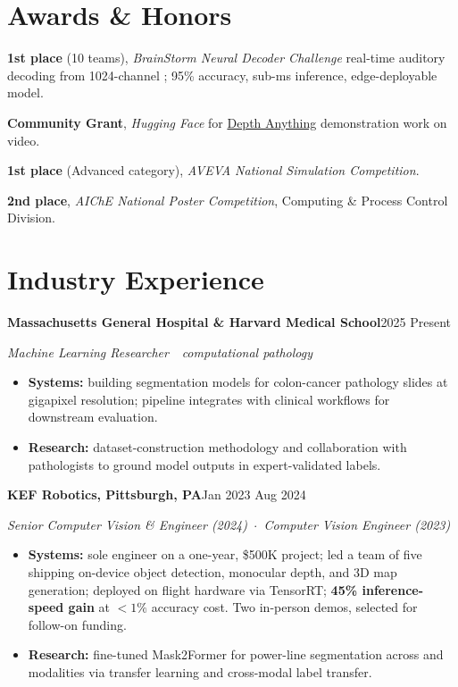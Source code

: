 \documentclass[10pt,letterpaper]{article}
\newcommand{\sansfam}{\sffamily}
\newcommand{\bdash}{\,\textemdash\,}
\newcommand{\datestamp}[1]{{\sansfam\footnotesize\color{meta}\figureversion{lf}#1}}
\newcommand{\role}[2]{%
  \filbreak%
  \par\vspace{1pt}%
  \noindent\textbf{#1}\hfill\datestamp{#2}\par\nopagebreak}
\newcommand{\sub}[1]{\noindent\textit{\footnotesize\color{meta} #1}\par\nopagebreak}
\newcommand{\acro}[1]{\textls[80]{#1}}
\begin{document}
\section{Awards \& Honors}

\begin{list}{}{%
  \setlength{\leftmargin}{3.4em}%
  \setlength{\labelwidth}{2.6em}%
  \setlength{\labelsep}{0.5em}%
  \setlength{\itemsep}{1pt}%
  \setlength{\parsep}{0pt}%
  \setlength{\topsep}{1pt}}
\item[\datestamp{2026}] \textbf{1st place} (10 teams), \textit{BrainStorm Neural Decoder Challenge}\bdash{}real-time auditory decoding from 1024-channel \acro{ECoG}; 95\% accuracy, sub-ms inference, edge-deployable model.
\item[\datestamp{2024}] \textbf{Community Grant}, \textit{Hugging Face}\bdash{}for \href{https://depth-anything.github.io/}{Depth Anything} demonstration work on video.
\item[\datestamp{2019}] \textbf{1st place} (Advanced category), \textit{AVEVA National Simulation Competition}.
\item[\datestamp{2018}] \textbf{2nd place}, \textit{AIChE National Poster Competition}, Computing \& Process Control Division.
\end{list}

\section{Industry Experience}

\role{Massachusetts General Hospital \& Harvard Medical School}{2025 \textendash{} Present}
\sub{Machine Learning Researcher \bdash{} computational pathology}
\begin{itemize}
  \item \textbf{Systems:} building segmentation models for colon-cancer pathology slides at gigapixel resolution; pipeline integrates with clinical workflows for downstream evaluation.
  \item \textbf{Research:} dataset-construction methodology and collaboration with pathologists to ground model outputs in expert-validated labels.
\end{itemize}

\role{KEF Robotics, Pittsburgh, PA}{Jan 2023 \textendash{} Aug 2024}
\sub{Senior Computer Vision \& \acro{ML} Engineer (2024) \,$\cdot$\, Computer Vision Engineer (2023)}
\begin{itemize}
  \item \textbf{Systems:} sole \acro{ML} engineer on a one-year, \$500K project; led a team of five shipping on-device object detection, monocular depth, and 3D map generation; deployed on flight hardware via TensorRT; \textbf{45\% inference-speed gain} at $<\!1\%$ accuracy cost. Two in-person demos, selected for follow-on funding.
  \item \textbf{Research:} fine-tuned Mask2Former for power-line segmentation across \acro{RGB} and \acro{IR} modalities via transfer learning and cross-modal label transfer.
\end{itemize}
\end{document}
